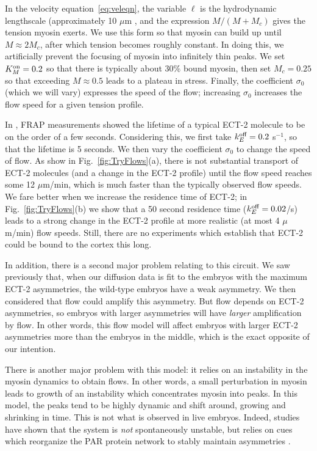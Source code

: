 \documentclass[11pt]{article}
\begin{document}
In the velocity equation\ \eqref{eq:veleqn}, the variable $\ell$ is the hydrodynamic lengthscale (approximately 10 $\mu$m \cite{mayer2010anisotropies}, and the expression $M/(M+M_c)$ gives the tension myosin exerts. We use this form so that myosin can build up until $M \approx 2 M_c$, after which tension becomes roughly constant. In doing this, we artificially prevent the focusing of myosin into infinitely thin peaks. We set $K^\text{on}_M=0.2$ so that there is typically about 30\% bound myosin, then set $M_c = 0.25$ so that exceeding $M \approx 0.5$ leads to a plateau in stress. Finally, the coefficient $\sigma_0$ (which we will vary) expresses the speed of the flow; increasing $\sigma_0$ increases the flow speed for a given tension profile.

In \cite{longhini2022aurora}, FRAP measurements showed the lifetime of a typical ECT-2 molecule to be on the order of a few seconds. Considering this, we first take $k^\text{off}_E=0.2$ s$^{-1}$, so that the lifetime is 5 seconds. We then vary the coefficient $\sigma_0$ to change the speed of flow. As show in Fig.\ \ref{fig:TryFlows}(a), there is not substantial transport of ECT-2 molecules (and a change in the ECT-2 profile) until the flow speed reaches some 12 $\mu$m/min, which is much faster than the typically observed flow speeds. We fare better when we increase the residence time of ECT-2; in Fig.\ \ref{fig:TryFlows}(b) we show that a 50 second residence time ($k^\text{off}_E=0.02$/s) leads to a strong change in the ECT-2 profile at more realistic (at most 4 $\mu$m/min) flow speeds. Still, there are no experiments which establish that ECT-2 could be bound to the cortex this long. 

In addition, there is a second major problem relating to this circuit. We saw previously that, when our diffusion data is fit to the embryos with the maximum ECT-2 asymmetries, the wild-type embryos have a weak asymmetry. We then considered that flow could amplify this asymmetry. But flow depends on ECT-2 asymmetries, so embryos with larger asymmetries will have \emph{larger} amplification by flow. In other words, this flow model will affect embryos with larger ECT-2 asymmetries more than the embryos in the middle, which is the exact opposite of our intention.

There is another major problem with this model: it relies on an instability in the myosin dynamics to obtain flows. In other words, a small perturbation in myosin leads to growth of an instability which concentrates myosin into peaks. In this model, the peaks tend to be highly dynamic and shift around, growing and shrinking in time. This is not what is observed in live embryos. Indeed, studies have shown that the system is \emph{not} spontaneously unstable, but relies on cues which reorganize the PAR protein network to stably maintain asymmetries \cite{gross2019guiding}.
\end{document}
